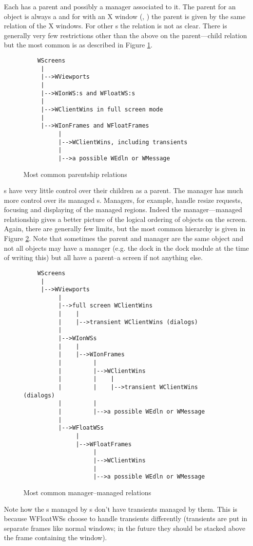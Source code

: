 Each  has a parent and possibly a manager associated to it.
The parent for an object is always a  and for
 with an X window (, ) the
parent  is given by the same relation of the X windows.
For other s the relation is not as clear. There is generally
very few restrictions other than the above on the parent---child relation
but the most common is as described in Figure \ref{fig:parentship}.

\begin{figure}
\begin{verbatim}
    WScreens
     |
     |-->WViewports
     |
     |-->WIonWS:s and WFloatWS:s
     |
     |-->WClientWins in full screen mode
     |
     |-->WIonFrames and WFloatFrames
          |
          |-->WClientWins, including transients
          |
          |-->a possible WEdln or WMessage
\end{verbatim}
\caption{Most common parentship relations}
\label{fig:parentship}
\end{figure}

s have very little control over their children as a parent.
The manager  has much more control over its
managed s. Managers, for example, handle resize requests,
focusing and displaying of the managed regions. Indeed the manager---managed
relationship gives a better picture of the logical ordering of objects on
the screen. Again, there are generally few limits, but the most common
hierarchy is given in Figure \ref{fig:managership}. Note that sometimes
the parent and manager are the same object and not all objects may have
a manager (e.g. the dock in the dock module at the time of writing this)
but all have a parent--a screen if not anything else.

\begin{figure}
\begin{verbatim}
    WScreens
     |
     |-->WViewports
          |
          |-->full screen WClientWins
          |    |
          |    |-->transient WClientWins (dialogs)
          |
          |-->WIonWSs
          |    |
          |    |-->WIonFrames
          |         |
          |         |-->WClientWins
          |         |    |
          |         |    |-->transient WClientWins (dialogs)
          |         |
          |         |-->a possible WEdln or WMessage
          |
          |-->WFloatWSs
               |
               |-->WFloatFrames
                    |
                    |-->WClientWins
                    |
                    |-->a possible WEdln or WMessage
\end{verbatim}
\caption{Most common manager--managed relations}
\label{fig:managership}
\end{figure}

Note how the s managed by s don't have
transients managed by them. This is because WFloatWSs choose to handle
transients differently (transients are put in separate frames like normal
windows; in the future they should be stacked above the frame containing the
 window).
